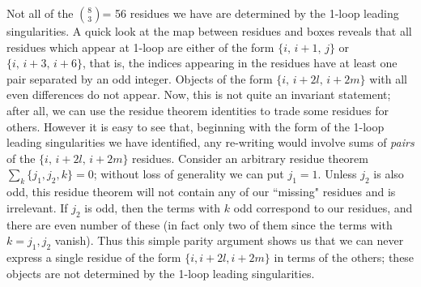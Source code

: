 \documentclass[12pt]{article}
\newcommand{\be}{\begin{eqnarray}}
\newcommand{\ee}{\end{eqnarray}}
\begin{document}
Not all of the $8 \choose 3$= 56 residues we have are determined by the 1-loop leading singularities. A quick look at the map between residues and boxes reveals that all residues which appear at 1-loop are either of the form $\{i, \, i+1, \, j\}$ or $\{i, \, i+3, \, i+6\}$, that is, the indices appearing in the residues have at least one pair separated by an odd integer. Objects of the form $\{i, \, i+2l, \, i+2m\}$ with all even differences do not appear. Now, this is not quite an invariant statement; after all, we can use the residue theorem identities to trade some residues for others. However it is easy to see that, beginning with the form of the 1-loop leading singularities we have identified, any re-writing would involve sums of {\it pairs} of the $\{i, \, i+2l, \, i+2m\}$ residues.
Consider an arbitrary residue theorem $\sum_k \{j_1,j_2,k\}= 0$; without loss of generality we can put $j_1 =1$. Unless $j_2$ is also odd, this residue theorem will not contain any of our ``missing" residues and is irrelevant. If $j_2$ is odd, then the terms with $k$ odd correspond to our residues, and there are even number of these (in fact only two of them since the terms with $k=j_1,j_2$ vanish). Thus this simple parity argument shows us that we can never express a single residue of the form $\{i,i+2l, i+ 2m\}$ in terms of the others; these objects are not determined by the 1-loop leading singularities.
\end{document}

